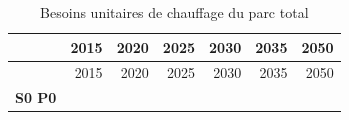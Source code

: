 \documentclass[]{article}
\begin{document}
\begin{longtable}[]{@{}crrrrrr@{}}
\caption{Besoins unitaires de chauffage du parc total}\tabularnewline
\toprule
\begin{minipage}[b]{0.19\columnwidth}\centering\strut
~\strut
\end{minipage} & \begin{minipage}[b]{0.08\columnwidth}\raggedleft\strut
2015\strut
\end{minipage} & \begin{minipage}[b]{0.08\columnwidth}\raggedleft\strut
2020\strut
\end{minipage} & \begin{minipage}[b]{0.08\columnwidth}\raggedleft\strut
2025\strut
\end{minipage} & \begin{minipage}[b]{0.08\columnwidth}\raggedleft\strut
2030\strut
\end{minipage} & \begin{minipage}[b]{0.08\columnwidth}\raggedleft\strut
2035\strut
\end{minipage} & \begin{minipage}[b]{0.08\columnwidth}\raggedleft\strut
2050\strut
\end{minipage}\tabularnewline
\midrule
\endfirsthead
\toprule
\begin{minipage}[b]{0.19\columnwidth}\centering\strut
~\strut
\end{minipage} & \begin{minipage}[b]{0.08\columnwidth}\raggedleft\strut
2015\strut
\end{minipage} & \begin{minipage}[b]{0.08\columnwidth}\raggedleft\strut
2020\strut
\end{minipage} & \begin{minipage}[b]{0.08\columnwidth}\raggedleft\strut
2025\strut
\end{minipage} & \begin{minipage}[b]{0.08\columnwidth}\raggedleft\strut
2030\strut
\end{minipage} & \begin{minipage}[b]{0.08\columnwidth}\raggedleft\strut
2035\strut
\end{minipage} & \begin{minipage}[b]{0.08\columnwidth}\raggedleft\strut
2050\strut
\end{minipage}\tabularnewline
\midrule
\endhead
\begin{minipage}[t]{0.19\columnwidth}\centering\strut
\textbf{S0 P0}\strut

\end{minipage}
\end{longtable}
\end{document}
